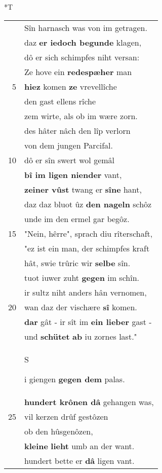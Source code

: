 \documentclass[8pt,a4paper,notitlepage]{article}
\begin{document}
\begin{table}[ht]
\begin{minipage}[t]{0.5\linewidth}
\small
\begin{center}*T
\end{center}
\begin{tabular}{rl}
 & Sîn harnasch was von im getragen.\\ 
 & daz \textbf{er iedoch begunde} klagen,\\ 
 & dô er sich schimpfes niht versan:\\ 
 & Ze hove ein \textbf{redespæher} man\\ 
5 & \textbf{hiez} komen \textbf{ze} vrevellîche\\ 
 & den gast ellens rîche\\ 
 & zem wirte, als ob im wære zorn.\\ 
 & des hâter nâch den lîp verlorn\\ 
 & von dem jungen Parcifal.\\ 
10 & dô er sîn swert wol gemâl\\ 
 & \textbf{bî im ligen niender} vant,\\ 
 & \textbf{zeiner vûst} twang er \textbf{sîne} hant,\\ 
 & daz daz bluot ûz \textbf{den nageln} schôz\\ 
 & unde im den ermel gar begôz.\\ 
15 & "Nein, hêrre", sprach diu rîterschaft,\\ 
 & "ez ist ein man, der schimpfes kraft\\ 
 & hât, swie trûric wir \textbf{selbe} sîn.\\ 
 & tuot iuwer zuht \textbf{gegen} im schîn.\\ 
 & ir sultz niht anders hân vernomen,\\ 
20 & wan daz der vischære \textbf{sî} komen.\\ 
 & \textbf{dar} gât - ir sît im \textbf{ein lieber} gast -\\ 
 & und \textbf{schütet} \textbf{ab} iu zornes last."\\ 
 & \begin{large}S\end{large}i giengen \textbf{gegen dem} palas.\\ 
 & \textbf{hundert krônen dâ} gehangen was,\\ 
25 & vil kerzen drûf gestôzen\\ 
 & ob den hûsgenôzen,\\ 
 & \textbf{kleine} \textbf{lieht} umb an der want.\\ 
 & hundert bette er \textbf{dâ} ligen vant.\\ 

\end{tabular}
\end{minipage}
\end{table}
\end{document}
